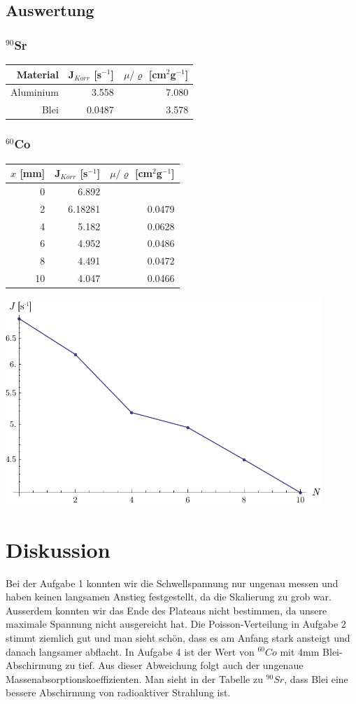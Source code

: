 \documentclass[12pt,a4paper]{article}
\begin{document}
\subsection*{Auswertung}
\subsubsection*{${}^{90}$Sr}
\begin{tabular}{|r|r|r|}
\hline
Material&J$_{Korr}$ [s$^{-1}$]&$\mu /\varrho $ [cm${}^2$g${}^{-1}$]\\
\hline
Aluminium&3.558&7.080\\
Blei&0.0487&3.578\\
\hline
\end{tabular}

\subsubsection*{${}^{60}$Co}
\begin{tabular}{|r|r|r|}
\hline
$x$ [mm]&J$_{Korr}$ [s$^{-1}$]&$\mu /\varrho $ [cm${}^2$g${}^{-1}$]\\
\hline
0&6.892&\\
2&6.18281&0.0479\\
4&5.182&0.0628\\
6&4.952&0.0486\\
8&4.491&0.0472\\
10&4.047&0.0466\\
\hline
\end{tabular}
\begin{center}
\includegraphics[width=12cm]{diagram4.pdf}
\end{center}

\section*{Diskussion}
Bei der Aufgabe 1 konnten wir die Schwellspannung nur ungenau messen und haben keinen langsamen Anstieg festgestellt, da die Skalierung zu grob war. Ausserdem konnten wir das Ende des Plateaus nicht bestimmen, da unsere maximale Spannung nicht ausgereicht hat.
Die Poisson-Verteilung in Aufgabe 2 stimmt ziemlich gut und man sieht sch\"on, dass es am Anfang stark ansteigt und danach langsamer abflacht.
In Aufgabe 4 ist der Wert von $^{60}Co$ mit 4mm Blei-Abschirmung zu tief. Aus dieser Abweichung folgt auch der ungenaue Massenabsorptionskoeffizienten. Man sieht in der Tabelle zu $^{90}Sr$, dass Blei eine bessere Abschirmung von radioaktiver Strahlung ist.
\end{document}
